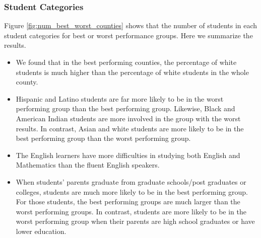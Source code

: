 \documentclass[11pt]{article}
\begin{document}
\subsubsection{Student Categories}

Figure \ref{fig:num_best_worst_counties} shows that the number of students in each student categories for best or worst performance groups. Here we summarize the results.

\begin{itemize}
	\item  We found that in the best performing counties, the percentage of white students is much higher than the percentage of white students in the whole county.
\item Hispanic and Latino students are far more likely to be in the worst performing group than the best performing group. Likewise, Black and American Indian students are more involved in the group with the worst results. In contrast, Asian and white students are more likely to be in the best performing group than the worst performing group.
\item The English learners have more difficulties in studying both English and Mathematics than the fluent English speakers.
\item When students' parents graduate from graduate schools/post graduates or colleges, students are much more likely to be in the best performing group. For those students, the best performing groups are much larger than the worst performing groups. In contrast, students are more likely to be in the worst performing group when their parents are high school graduates or have lower education.
\end{itemize}
 
\end{document}
